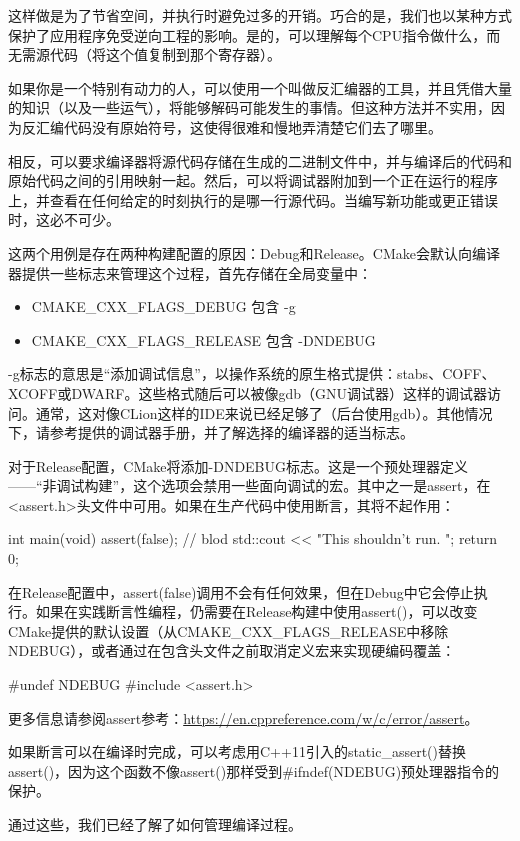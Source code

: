这样做是为了节省空间，并执行时避免过多的开销。巧合的是，我们也以某种方式保护了应用程序免受逆向工程的影响。是的，可以理解每个CPU指令做什么，而无需源代码（将这个值复制到那个寄存器）。

如果你是一个特别有动力的人，可以使用一个叫做反汇编器的工具，并且凭借大量的知识（以及一些运气），将能够解码可能发生的事情。但这种方法并不实用，因为反汇编代码没有原始符号，这使得很难和慢地弄清楚它们去了哪里。

相反，可以要求编译器将源代码存储在生成的二进制文件中，并与编译后的代码和原始代码之间的引用映射一起。然后，可以将调试器附加到一个正在运行的程序上，并查看在任何给定的时刻执行的是哪一行源代码。当编写新功能或更正错误时，这必不可少。

这两个用例是存在两种构建配置的原因：Debug和Release。CMake会默认向编译器提供一些标志来管理这个过程，首先存储在全局变量中：

\begin{itemize}
\item
CMAKE\_CXX\_FLAGS\_DEBUG 包含 -g

\item
CMAKE\_CXX\_FLAGS\_RELEASE 包含 -DNDEBUG
\end{itemize}

-g标志的意思是“添加调试信息”，以操作系统的原生格式提供：stabs、COFF、XCOFF或DWARF。这些格式随后可以被像gdb（GNU调试器）这样的调试器访问。通常，这对像CLion这样的IDE来说已经足够了（后台使用gdb）。其他情况下，请参考提供的调试器手册，并了解选择的编译器的适当标志。

对于Release配置，CMake将添加-DNDEBUG标志。这是一个预处理器定义——“非调试构建”，这个选项会禁用一些面向调试的宏。其中之一是assert，在<assert.h>头文件中可用。如果在生产代码中使用断言，其将不起作用：

\begin{cpp}
int main(void)
{
    assert(false); // blod
    std::cout << "This shouldn't run. \n";
    return 0;
}
\end{cpp}

在Release配置中，assert(false)调用不会有任何效果，但在Debug中它会停止执行。如果在实践断言性编程，仍需要在Release构建中使用assert()，可以改变CMake提供的默认设置（从CMAKE\_CXX\_FLAGS\_RELEASE中移除NDEBUG），或者通过在包含头文件之前取消定义宏来实现硬编码覆盖：

\begin{cpp}
#undef NDEBUG
#include <assert.h>
\end{cpp}

更多信息请参阅assert参考：\url{https://en.cppreference.com/w/c/error/assert}。

如果断言可以在编译时完成，可以考虑用C++11引入的static\_assert()替换assert()，因为这个函数不像assert()那样受到\#ifndef(NDEBUG)预处理器指令的保护。

通过这些，我们已经了解了如何管理编译过程。











